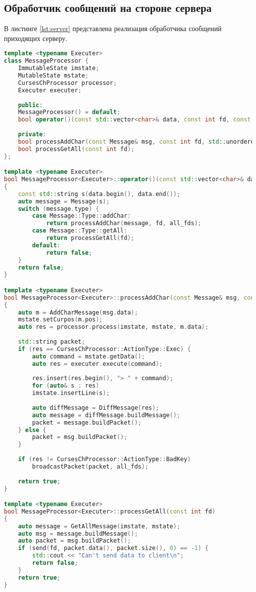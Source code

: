 \subsection{Обработчик сообщений на стороне сервера}

В листинге \ref{lst:server} представлена реализация обработчика сообщений приходящих серверу.\\

\begin{lstlisting}[label=lst:server,caption=Обработчик сообщений (сервер),language=c++]
template <typename Executer>
class MessageProcessor {
	ImmutableState imstate;
	MutableState mstate;
	CursesChProcessor processor;
	Executer executer;
	
	public:
	MessageProcessor() = default;
	bool operator()(const std::vector<char>& data, const int fd, const std::unordered_set<int>& all_fds);
		
	private:
	bool processAddChar(const Message& msg, const int fd, std::unordered_set<int> all_fds);
	bool processGetAll(const int fd);
};

template <typename Executer>
bool MessageProcessor<Executer>::operator()(const std::vector<char>& data, const int fd, const std::unordered_set<int>& all_fds)
{
	const std::string s(data.begin(), data.end());
	auto message = Message(s);
	switch (message.type) {
		case Message::Type::addChar:
			return processAddChar(message, fd, all_fds);
		case Message::Type::getAll:
			return processGetAll(fd);
		default:
			return false;
	}
	return false;
}

template <typename Executer>
bool MessageProcessor<Executer>::processAddChar(const Message& msg, const int fd, std::unordered_set<int> all_fds)
{
	auto m = AddCharMessage(msg.data);
	mstate.setCurpos(m.pos);
	auto res = processor.process(imstate, mstate, m.data);
	
	std::string packet;
	if (res == CursesChProcessor::ActionType::Exec) {
		auto command = mstate.getData();
		auto res = executer.execute(command);
		
		res.insert(res.begin(), "> " + command);
		for (auto& s : res)
		imstate.insertLine(s);
		
		auto diffMessage = DiffMessage(res);
		auto message = diffMessage.buildMessage();
		packet = message.buildPacket();
	} else {
		packet = msg.buildPacket();
	}
	
	if (res != CursesChProcessor::ActionType::BadKey)
		broadcastPacket(packet, all_fds);
	
	return true;
}

template <typename Executer>
bool MessageProcessor<Executer>::processGetAll(const int fd)
{
	auto message = GetAllMessage(imstate, mstate);
	auto msg = message.buildMessage();
	auto packet = msg.buildPacket();
	if (send(fd, packet.data(), packet.size(), 0) == -1) {
		std::cout << "Can't send data to client\n";
		return false;
	}
	return true;
}
\end{lstlisting}

